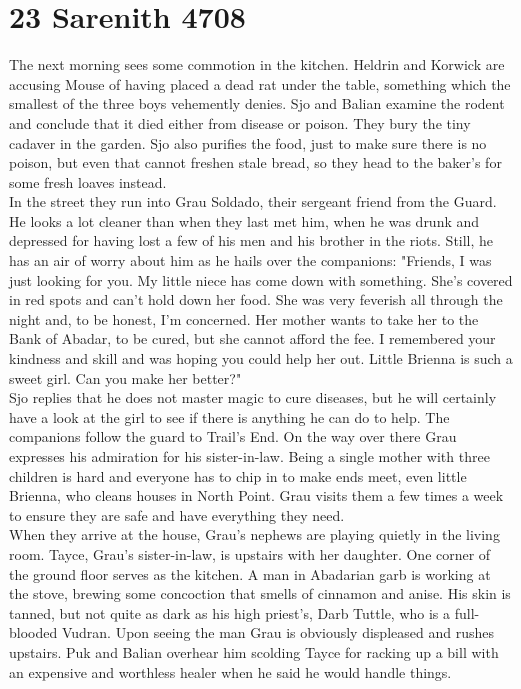 \section{23 Sarenith 4708}

The next morning sees some commotion in the kitchen. Heldrin and Korwick are accusing Mouse of having placed a dead rat under the table, something which the smallest of the three boys vehemently denies. Sjo and Balian examine the rodent and conclude that it died either from disease or poison. They bury the tiny cadaver in the garden. Sjo also purifies the food, just to make sure there is no poison, but even that cannot freshen stale bread, so they head to the baker's for some fresh loaves instead.\\

In the street they run into Grau Soldado, their sergeant friend from the Guard. He looks a lot cleaner than when they last met him, when he was drunk and depressed for having lost a few of his men and his brother in the riots. Still, he has an air of worry about him as he hails over the companions: "Friends, I was just looking for you. My little niece has come down with something. She's covered in red spots and can't hold down her food. She was very feverish all through the night and, to be honest, I'm concerned. Her mother wants to take her to the Bank of Abadar, to be cured, but she cannot afford the fee. I remembered your kindness and skill and was hoping you could help her out. Little Brienna is such a sweet girl. Can you make her better?"\\

Sjo replies that he does not master magic to cure diseases, but he will certainly have a look at the girl to see if there is anything he can do to help. The companions follow the guard to Trail's End. On the way over there Grau expresses his admiration for his sister-in-law. Being a single mother with three children is hard and everyone has to chip in to make ends meet, even little Brienna, who cleans houses in North Point. Grau visits them a few times a week to ensure they are safe and have everything they need.\\

When they arrive at the house, Grau's nephews are playing quietly in the living room. Tayce, Grau's sister-in-law, is upstairs with her daughter. One corner of the ground floor serves as the kitchen. A man in Abadarian garb is working at the stove, brewing some concoction that smells of cinnamon and anise. His skin is tanned, but not quite as dark as his high priest's, Darb Tuttle, who is a full-blooded Vudran. Upon seeing the man Grau is obviously displeased and rushes upstairs. Puk and Balian overhear him scolding Tayce for racking up a bill with an expensive and worthless healer when he said he would handle things.\\


